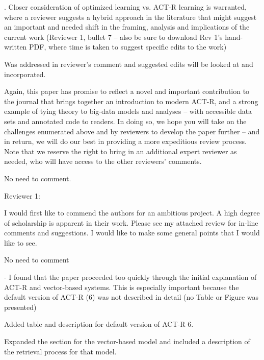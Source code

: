 \documentclass[answers,12pt]{exam}
\begin{document}
\begin{questions}
. Closer consideration of optimized learning vs. ACT-R learning is warranted, where a reviewer suggests a hybrid approach in the literature that might suggest an important and needed shift in the framing, analysis and implications of the current work (Reviewer 1, bullet 7 -- also be sure to download Rev 1's hand-written PDF, where time is taken to suggest specific edits to the work)

\begin{solution}
Was addressed in reviewer's comment and suggested edits will be looked at and incorporated.
\end{solution}

\question Again, this paper has promise to reflect a novel and important contribution to the journal that brings together an introduction to modern ACT-R, and a strong example of tying theory to big-data models and analyses -- with accessible data sets and annotated code to readers. In doing so, we hope you will take on the challenges enumerated above and by reviewers to develop the paper further -- and in return, we will do our best in providing a more expeditious review process. Note that we reserve the right to bring in an additional expert reviewer as needed, who will have access to the other reviewers' comments.

\begin{solution}
No need to comment.
\end{solution}


Reviewer 1: 

\question I would first like to commend the authors for an ambitious project. A high degree of scholarship is apparent in their work. Please see my attached review for in-line comments and suggestions. I would like to make some general points that I would like to see.

\begin{solution}
No need to comment
\end{solution}

\question - I found that the paper proceeded too quickly through the initial explanation of ACT-R and vector-based systems. This is especially important because the default version of ACT-R (6) was not described in detail (no Table or Figure was presented)

\begin{solution}
Added table and description for default version of ACT-R 6.

Expanded the section for the vector-based model and included a description of the retrieval process for that model.


\end{solution}
\end{questions}
\end{document}
